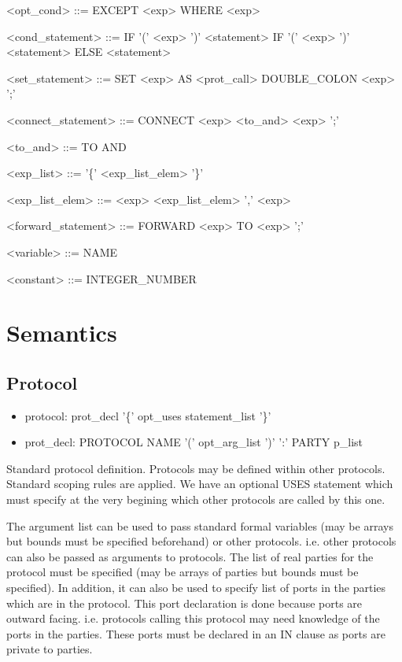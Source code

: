 \documentclass{article}
\begin{document}
\begin{grammar}
<opt\_cond> ::= EXCEPT <exp> \alt WHERE <exp>

<cond\_statement> ::= IF '(' <exp> ')' <statement> \alt IF '(' <exp> ')' <statement> ELSE <statement>

<set\_statement> ::= SET <exp> AS <prot\_call> DOUBLE\_COLON <exp> ';'

<connect\_statement> ::= CONNECT <exp> <to\_and> <exp> ';'

<to\_and> ::= TO \alt AND

<exp\_list> ::= '\{' <exp\_list\_elem> '\}'

<exp\_list\_elem> ::= <exp> \alt <exp\_list\_elem> ',' <exp>

<forward\_statement> ::= FORWARD <exp> TO <exp> ';'

<variable> ::= NAME

<constant> ::= INTEGER\_NUMBER

\end{grammar}

\section{Semantics}

\subsection{Protocol}

\begin{itemize}
\item protocol: prot\_decl '\{' opt\_uses statement\_list '\}'
\item prot\_decl: PROTOCOL NAME '(' opt\_arg\_list ')' ':' PARTY p\_list
\end{itemize}

Standard protocol definition. Protocols may be defined within other protocols. Standard scoping rules are applied. We have an optional USES statement which must specify at the very begining which other protocols are called by this one.

The argument list can be used to pass standard formal variables (may be arrays but bounds must be specified beforehand) or other protocols. i.e. other protocols can also be passed as arguments to protocols. The list of real parties for the protocol must be specified (may be arrays of parties but bounds must be specified). In addition, it can also be used to specify list of ports in the parties which are in the protocol. This port declaration is done because ports are outward facing. i.e. protocols calling this protocol may need knowledge of the ports in the parties. These ports must be declared in an IN clause as ports are private to parties.
\end{document}
